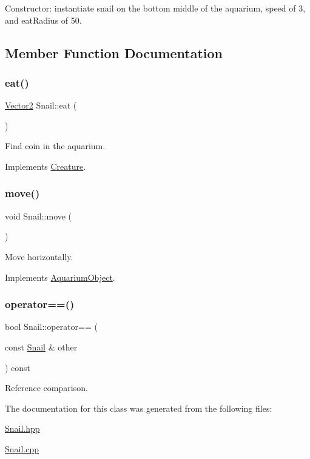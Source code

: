Constructor\+: instantiate snail on the bottom middle of the aquarium, speed of 3, and eat\+Radius of 50. 



\subsection{Member Function Documentation}
\mbox{\label{class_snail_a0905a469c6333970b8246abca37795f1}} 
\subsubsection{\texorpdfstring{eat()}{eat()}}
{\footnotesize\ttfamily \mbox{\hyperlink{struct_vector2}{Vector2}} Snail\+::eat (\begin{DoxyParamCaption}{ }\end{DoxyParamCaption})\hspace{0.3cm}{\ttfamily [virtual]}}



Find coin in the aquarium. 



Implements \mbox{\hyperlink{class_creature_a0d531a4c04c1021833ddb0e48864dbf4}{Creature}}.

\mbox{\label{class_snail_af5892ec122d9199480c813b74488256b}} 
\subsubsection{\texorpdfstring{move()}{move()}}
{\footnotesize\ttfamily void Snail\+::move (\begin{DoxyParamCaption}{ }\end{DoxyParamCaption})\hspace{0.3cm}{\ttfamily [virtual]}}



Move horizontally. 



Implements \mbox{\hyperlink{class_aquarium_object_a42c4de640f89ac8aebc26b7618578575}{Aquarium\+Object}}.

\mbox{\label{class_snail_ab01308256de08e789ca752e1608120f7}} 
\subsubsection{\texorpdfstring{operator==()}{operator==()}}
{\footnotesize\ttfamily bool Snail\+::operator== (\begin{DoxyParamCaption}\item[{const \mbox{\hyperlink{class_snail}{Snail}} \&}]{other }\end{DoxyParamCaption}) const}



Reference comparison. 



The documentation for this class was generated from the following files\+:\begin{DoxyCompactItemize}
\item 
\mbox{\hyperlink{_snail_8hpp}{Snail.\+hpp}}\item 
\mbox{\hyperlink{_snail_8cpp}{Snail.\+cpp}}\end{DoxyCompactItemize}
